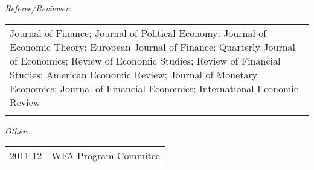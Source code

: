 \documentclass[11pt,letterpaper,overlapped]{res}
\begin{document}
\begin{resume}
\begin{itemize}
\emph{Referee/Reviewer}:\\

 \begin{tabular}{p{14cm}}
Journal of Finance; Journal of Political Economy; Journal of Economic Theory; European Journal of Finance; Quarterly Journal of Economics; Review of Economic Studies; Review of Financial Studies; American Economic Review;  Journal of Monetary Economics; Journal of Financial Economics; International Economic Review\\\\
 \end{tabular}

\emph{Other:}\\

  \begin{tabular}{ll}
 2011-12 & WFA Program Commitee\\
 \end{tabular}
 
\end{itemize}



\end{resume}
\end{document}
